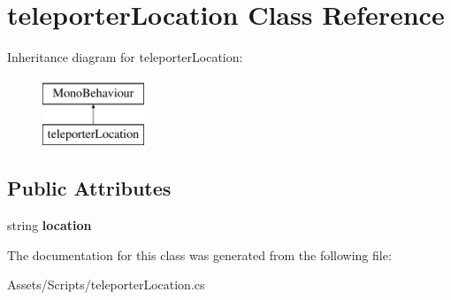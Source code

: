 \hypertarget{classteleporter_location}{}\section{teleporter\+Location Class Reference}
\label{classteleporter_location}
Inheritance diagram for teleporter\+Location\+:\begin{figure}[H]
\begin{center}
\leavevmode
\includegraphics[height=2.000000cm]{classteleporter_location}
\end{center}
\end{figure}
\subsection*{Public Attributes}
\begin{DoxyCompactItemize}
\item 
\mbox{\label{classteleporter_location_a772d1224edea45e9a7ee52c35562fd7c}} 
string {\bfseries location}
\end{DoxyCompactItemize}


The documentation for this class was generated from the following file\+:\begin{DoxyCompactItemize}
\item 
Assets/\+Scripts/teleporter\+Location.\+cs\end{DoxyCompactItemize}
